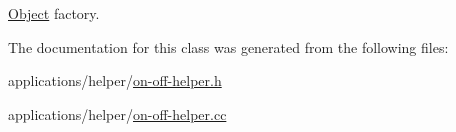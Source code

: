 \hyperlink{classns3_1_1Object}{Object} factory. 



The documentation for this class was generated from the following files\+:\begin{DoxyCompactItemize}
\item 
applications/helper/\hyperlink{on-off-helper_8h}{on-\/off-\/helper.\+h}\item 
applications/helper/\hyperlink{on-off-helper_8cc}{on-\/off-\/helper.\+cc}\end{DoxyCompactItemize}
